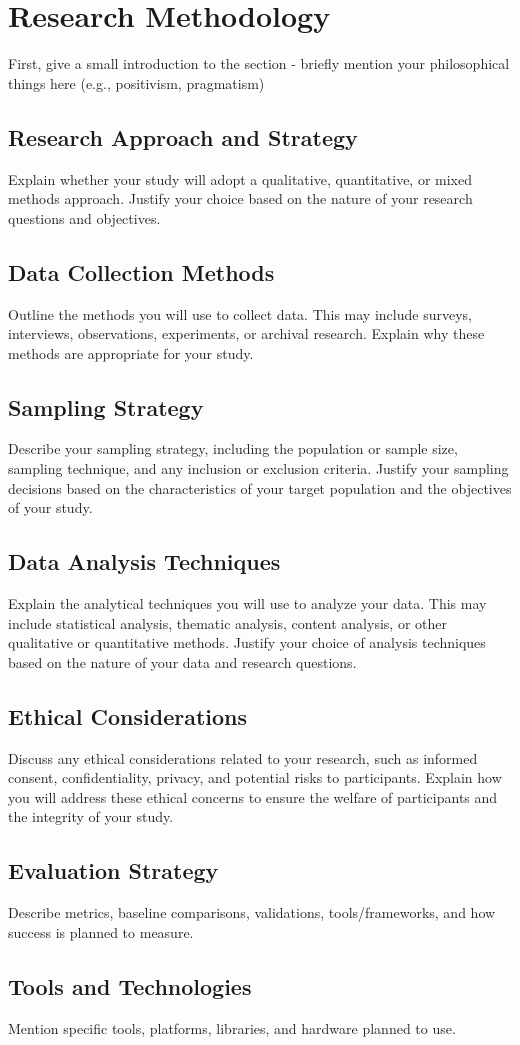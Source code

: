 \section{Research Methodology}

First, give a small introduction to the section - briefly mention your philosophical things here (e.g., positivism, pragmatism)

\subsection{Research Approach and Strategy}
Explain whether your study will adopt a qualitative, quantitative, or mixed methods approach. Justify your choice based on the nature of your research questions and objectives.

\subsection{Data Collection Methods}
Outline the methods you will use to collect data. This may include surveys, interviews, observations, experiments, or archival research. Explain why these methods are appropriate for your study.

\subsection{Sampling Strategy}
Describe your sampling strategy, including the population or sample size, sampling technique, and any inclusion or exclusion criteria. Justify your sampling decisions based on the characteristics of your target population and the objectives of your study.

\subsection{Data Analysis Techniques}
Explain the analytical techniques you will use to analyze your data. This may include statistical analysis, thematic analysis, content analysis, or other qualitative or quantitative methods. Justify your choice of analysis techniques based on the nature of your data and research questions.

\subsection{Ethical Considerations}
Discuss any ethical considerations related to your research, such as informed consent, confidentiality, privacy, and potential risks to participants. Explain how you will address these ethical concerns to ensure the welfare of participants and the integrity of your study.

\subsection{Evaluation Strategy}
Describe metrics, baseline comparisons, validations, tools/frameworks, and how success is planned to measure.

\subsection{Tools and Technologies}
Mention specific tools, platforms, libraries, and hardware planned to use.
